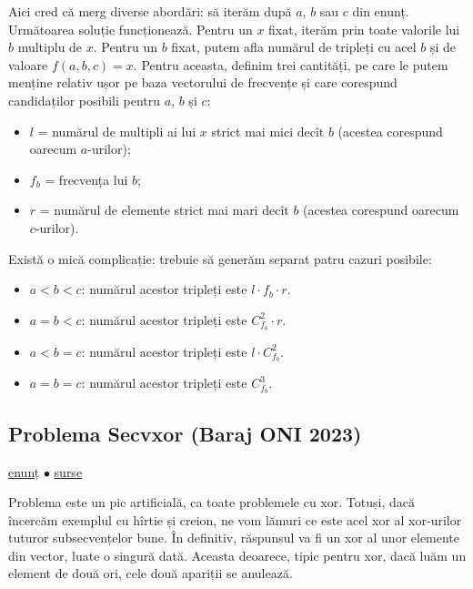 \documentclass[../main.tex]{subfiles}
\begin{document}
Aici cred că merg diverse abordări: să iterăm după $a$, $b$ sau $c$ din enunț. Următoarea soluție funcționează. Pentru un $x$ fixat, iterăm prin toate valorile lui $b$ multiplu de $x$. Pentru un $b$ fixat, putem afla numărul de tripleți cu acel $b$ și de valoare $f(a,b,c)=x$. Pentru aceasta, definim trei cantități, pe care le putem menține relativ ușor pe baza vectorului de frecvențe și care corespund candidaților posibili pentru $a$, $b$ și $c$:

\begin{itemize}
  \item $l$ = numărul de multipli ai lui $x$ strict mai mici decît $b$ (acestea corespund oarecum $a$-urilor);

  \item $f_b$ = frecvența lui $b$;

  \item $r$ = numărul de elemente strict mai mari decît $b$ (acestea corespund oarecum $c$-urilor).
\end{itemize}

Există o mică complicație: trebuie să generăm separat patru cazuri posibile:

\begin{itemize}
  \item $a < b < c$: numărul acestor tripleți este $l \cdot f_b \cdot r$.
  \item $a = b < c$: numărul acestor tripleți este $C_{f_b}^2 \cdot r$.
  \item $a < b = c$: numărul acestor tripleți este $l \cdot C_{f_b}^2$.
  \item $a = b = c$: numărul acestor tripleți este $C_{f_b}^3$.
\end{itemize}


\subsection{Problema Secvxor (Baraj ONI 2023)}
\label{problem:secvxor}

\href{https://kilonova.ro/problems/563}{enunț}
$\bullet$
\hyperref[code:secvxor]{surse}

Problema este un pic artificială, ca toate problemele cu xor. Totuși, dacă încercăm exemplul cu hîrtie și creion, ne vom lămuri ce este acel xor al xor-urilor tuturor subsecvențelor bune. În definitiv, răspunsul va fi un xor al unor elemente din vector, luate o singură dată. Aceasta deoarece, tipic pentru xor,  dacă luăm un element de două ori, cele două apariții se anulează.
\end{document}
